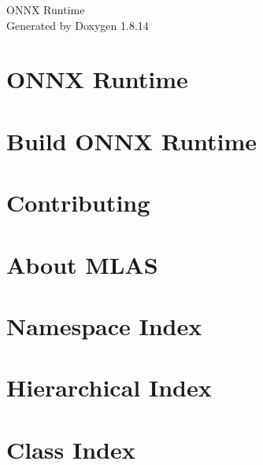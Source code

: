 \documentclass[twoside]{book}
\newcommand{\+}{\discretionary{\mbox{\scriptsize$\hookleftarrow$}}{}{}}
\newcommand{\clearemptydoublepage}{%
  \newpage{\pagestyle{empty}\cleardoublepage}%
}
\begin{document}
\hypersetup{pageanchor=false,
             bookmarksnumbered=true,
             pdfencoding=unicode
            }
\begin{titlepage}
\vspace*{7cm}
\begin{center}%
{\Large O\+N\+NX Runtime }\\
\vspace*{1cm}
{\large Generated by Doxygen 1.8.14}\\
\end{center}
\end{titlepage}
\clearemptydoublepage
{}
\tableofcontents
\clearemptydoublepage
{}
\hypersetup{pageanchor=true}

\chapter{O\+N\+NX Runtime}
\label{index}\hypertarget{index}{}
\chapter{Build O\+N\+NX Runtime}
\label{md_onnxruntime_BUILD}

\chapter{Contributing}
\label{md_onnxruntime_CONTRIBUTING}

\chapter{About M\+L\+AS}
\label{md_onnxruntime_onnxruntime_core_mlas_README}

\chapter{Namespace Index}

\chapter{Hierarchical Index}

\chapter{Class Index}

\end{document}
